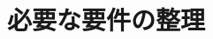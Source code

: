 \documentclass[submit,techrep,noauthor]{ipsj}
\def\|{\verb|}
\begin{document}
%4
\section{必要な要件の整理}
% \label{config}
% ファイルは次のようになる．下線部は投稿時に省略可能なもの．

% 4.1
% \subsection{表題・著者名等}

%  表題，著者名とその所属，および概要を前述のコマンドや環境により{\bf 和文と
%  英文の双方について}定義した後，\|\maketitle| によって出力する．











\end{document}
